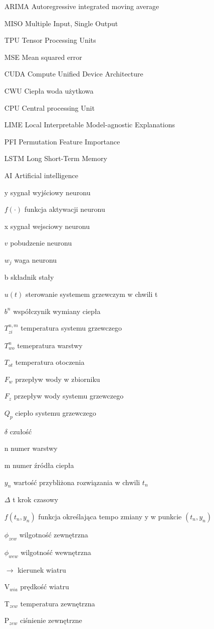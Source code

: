 \documentclass[a4paper,twoside,12pt]{book}
\begin{document}
\begin{appendices}
  \begin{itemize}
    \item[ARIMA] Autoregressive integrated moving average
    \item[MISO] Multiple Input, Single Output
    \item[TPU] Tensor Processing Units
    \item[MSE] Mean squared error
    \item[CUDA] Compute Unified Device Architecture
    \item[CWU] Ciepła woda użytkowa
    \item[CPU] Central processing Unit
    \item[LIME] Local Interpretable Model-agnostic Explanations
    \item[PFI] Permutation Feature Importance
    \item[LSTM] Long Short-Term Memory
    \item[AI] Artificial intelligence
    \item[y] sygnał wyjściowy neuronu
    \item[$f(\cdot)$] funkcja aktywacji neuronu
    \item[x] sygnał wejsciowy neuronu
    \item[$v$] pobudzenie neuronu
    \item[$w_j$]  waga neuronu
    \item[b] składnik stały
    \item[$u(t)$] sterowanie systemem grzewczym w chwili t
    \item[$b^n$] współczynik wymiany ciepła
    \item[$T_{zi}^{n,m}$] temperatura systemu grzewczego
    \item[$T_{wo}^{n}$] temepratura warstwy
    \item[$T_{ot}$] temperatura otoczenia
    \item[$F_w$] przepływ wody w zbiorniku
    \item[$F_z$] przepływ wody systemu grzewczego
    \item[$Q_p$] ciepło systemu grzewczego
    \item[$\delta$] czułość
    \item[n] numer warstwy
    \item[m] numer źródła ciepła
    \item[$y_n$] wartość przybliżona rozwiązania w chwili $t_n$
    \item[$\Delta$ t] krok czasowy
    \item[$f(t_n, y_n)$] funkcja określająca tempo zmiany y w punkcie $(t_n, y_n)$
    \item[$\phi_{zew}$] wilgotność zewnętrzna
    \item[$\phi_{wew}$] wilgotność wewnętrzna
    \item[$\longrightarrow$] kierunek wiatru
    \item[V$_{wia}$] prędkość wiatru
    \item[T$_{zew}$] temperatura zewnętrzna
    \item[P$_{zew}$] ciśnienie zewnętrzne
  \end{itemize}




\end{appendices}
\end{document}
